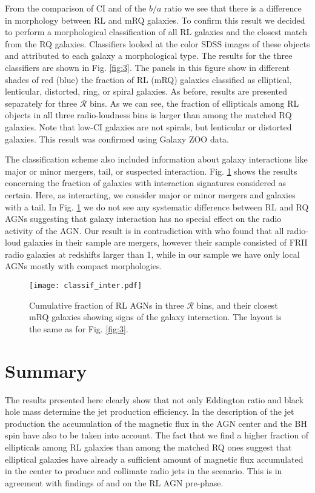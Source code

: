 \documentclass[utf8]{frontiersSCNS}
\begin{document}
From the comparison of CI and of the $b/a$ ratio we see that there is a difference in morphology between RL and mRQ galaxies. To confirm this result we decided to perform a morphological classification of all RL galaxies and the closest match from the RQ galaxies. Classifiers looked at the color SDSS images of these objects and attributed to each galaxy a morphological type. The results for the three classifiers are shown in Fig. \ref{fig:3}. The panels in this figure show in different shades of red (blue) the fraction of RL (mRQ) galaxies classified as elliptical, lenticular, distorted, ring, or spiral galaxies. As before, results are presented separately for three ${\mathcal R}$ bins. 
As we can see, the fraction of ellipticals among RL objects in all three radio-loudness bins is larger than among the matched RQ galaxies. Note that low-CI galaxies are not spirals, but lenticular or distorted galaxies. This result was confirmed using Galaxy ZOO data. 

The classification scheme also included information about galaxy interactions like major or minor mergers, tail, or suspected interaction. Fig. \ref{fig:4} shows the results concerning  the fraction of galaxies with interaction signatures considered as certain. Here, as interacting, we consider major or minor mergers and galaxies with a tail. In Fig. \ref{fig:4} we do not see any systematic difference between RL and RQ AGNs suggesting that galaxy interaction has no special effect on the radio activity of the AGN. Our result is in contradiction with \citet{Chiaberge.etal.2015a} who found that all radio-loud galaxies in their sample are mergers, however their sample consisted of FRII radio galaxies at redshifts larger than 1, while in our sample we have only local AGNs mostly with compact morphologies. 

\begin{figure}[h!]
\begin{center}
\texttt{[image: classif\_inter.pdf]}
\end{center}
\caption{Cumulative fraction of RL AGNs in three ${\mathcal R}$ bins, and their closest mRQ galaxies showing signs of the galaxy interaction. The layout is the same as for Fig. \ref{fig:3}.}\label{fig:4}
\end{figure}

\section{Summary}

The results presented here clearly show that not only Eddington ratio and black hole mass determine the jet production efficiency. In the description of the jet production the accumulation of the magnetic flux in the AGN center and the BH spin have also to be taken into account. The fact that we find a higher fraction of ellipticals among RL galaxies than among the matched RQ ones suggest that elliptical galaxies have already a sufficient amount of magnetic flux accumulated in the center to produce and collimate radio jets in the \citealp{1977MNRAS.179..433B} scenario. This is in agreement with findings of \citet{Sikora.etal.2013a} and \citet{Sikora.Begelman.2013a} on the RL AGN pre-phase. 
\end{document}
